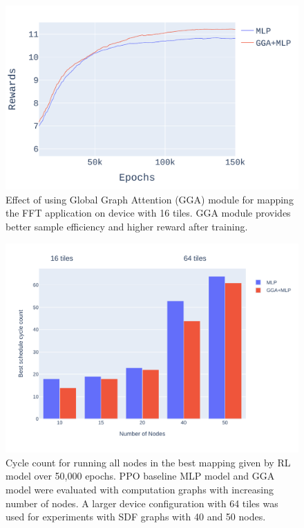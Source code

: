 \begin{figure}[tb]
  \centering
  \includegraphics[width=\linewidth]{fig/plot_gnn_atten_ppo.pdf}
  \caption{Effect of using Global Graph Attention (GGA) module for mapping the FFT application on device with 16 tiles. 
  GGA module provides better sample efficiency and higher reward after training. }
  \label{fig:ifft_rewards}
\end{figure}

\begin{figure}[tb]
  \centering
  \includegraphics[width=\linewidth]{fig/nodes_graph.pdf}
  \caption{Cycle count for running all nodes in the best mapping given by RL model over 50,000 epochs. 
  PPO baseline MLP model and GGA model were evaluated with computation graphs with increasing number of nodes. 
  A larger device configuration with 64 tiles was used for experiments with SDF graphs with 40 and 50 nodes. }
  \label{fig:nodes_graph}
\end{figure}

